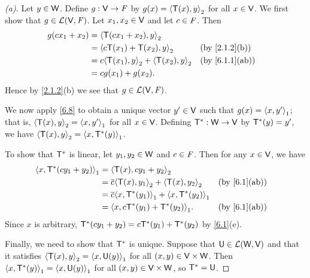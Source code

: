 \begin{proof}[(a)]
	Let \(y \in \mathsf{W}\).
	Define \(g : \mathsf{V} \to \mathit{F}\) by \(g(x) = \left\langle\mathsf{T}(x), y\right\rangle_2\) for all \(x \in \mathsf{V}\).
	We first show that \(g \in \mathcal{L}(\mathsf{V}, \mathit{F})\).
	Let \(x_1, x_2 \in \mathsf{V}\) and let \(c \in \mathit{F}\).
	Then
	\begin{align*}
		g(c x_1 + x_2) & = \inn{\T(c x_1 + x_2), y}_2                                    \\
		               & = \inn{c \T(x_1) + \T(x_2), y}_2            &  & \by{2.1.2}[b]  \\
		               & = c \inn{\T(x_1), y}_2 + \inn{\T(x_2), y}_2 &  & \by{6.1.1}[ab] \\
		               & = c g(x_1) + g(x_2).
	\end{align*}
	Hence by \cref{2.1.2}(b) we see that \(g \in \mathcal{L}(\mathsf{V}, \mathit{F})\).

	We now apply \cref{6.8} to obtain a unique vector \(y' \in \mathsf{V}\) such that \(g(x) = \left\langle x, y'\right\rangle_1\);
	that is, \(\left\langle\mathsf{T}(x), y\right\rangle_2 = \left\langle x, y'\right\rangle_1\) for all \(x \in \mathsf{V}\).
	Defining \(\mathsf{T}^* : \mathsf{W} \to \mathsf{V}\) by \(\mathsf{T}^*(y) = y'\), we have \(\left\langle\mathsf{T}(x), y\right\rangle_2 = \left\langle x, \mathsf{T}^*(y)\right\rangle_1\).

	To show that \(\mathsf{T}^*\) is linear, let \(y_1, y_2 \in \mathsf{W}\) and \(c \in \mathit{F}\).
	Then for any \(x \in \mathsf{V}\),
	we have
	\begin{align*}
		\inn{x, \T^*(c y_1 + y_2)}_1 & = \inn{\T(x), c y_1 + y_2}_2                                             \\
		                             & = \conj{c} \inn{\T(x), y_1}_2 + \inn{\T(x), y_2}_2     &  & \by{6.1}[ab] \\
		                             & = \conj{c} \inn{x, \T^*(y_1)}_1 + \inn{x, \T^*(y_2)}_1                   \\
		                             & = \inn{x, c \T^*(y_1) + \T^*(y_2)}_1.                  &  & \by{6.1}[ab]
	\end{align*}
	Since \(x\) is arbitrary, \(\mathsf{T}^*(c y_1 + y_2) = c \mathsf{T}^*(y_1) + \mathsf{T}^*(y_2)\) by \cref{6.1}(e).

	Finally, we need to show that \(\mathsf{T}^*\) is unique. Suppose that \(\mathsf{U} \in \mathcal{L}(\mathsf{W}, \mathsf{V})\) and that it satisfies \(\left\langle\mathsf{T}(x), y\right\rangle_2 = \left\langle x, \mathsf{U}(y)\right\rangle_1\) for all \((x, y) \in \mathsf{V} \times \mathsf{W}\).
	Then \(\left\langle x, \mathsf{T}^*(y)\right\rangle_1 = \left\langle x, \mathsf{U}(y)\right\rangle_1\) for all \((x, y) \in \mathsf{V} \times \mathsf{W}\), so \(\mathsf{T}^* = \mathsf{U}\).
\end{proof}

